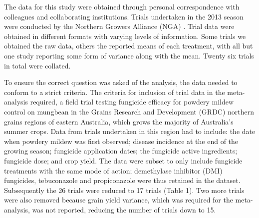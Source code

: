\documentclass[agronomy,article,submit,moreauthors,pdftex]{mdpi}
\begin{document}
The data for this study were obtained through personal correspondence
with colleagues and collaborating institutions. Trials undertaken in the
2013 season were conducted by the Northern Growers Alliance (NGA)
\citetext{\citeyear{goolhi2013}; \citeyear{premer2013}; \citeyear{Millmerran2013}; \citeyear{Marysmount2013}}.
Trial data were obtained in different formats with varying levels of
information. Some trials we obtained the raw data, others the reported
means of each treatment, with all but one study reporting some form of
variance along with the mean. Twenty six trials in total were collated.

To ensure the correct question was asked of the analysis, the data
needed to conform to a strict criteria. The criteria for inclusion of
trial data in the meta-analysis required, a field trial testing
fungicide efficacy for powdery mildew control on mungbean in the Grains
Research and Development (GRDC) northern grains regions of eastern
Australia, which grows the majority of Australia's summer crops. Data
from trials undertaken in this region had to include: the date when
powdery mildew was first observed; disease incidence at the end of the
growing season; fungicide application dates; the fungicide active
ingredients; fungicide dose; and crop yield. The data were subset to
only include fungicide treatments with the same mode of action;
demethylase inhibitor (DMI) fungicides, tebuconazole and propiconazole
were thus retained in the dataset. Subsequently the 26 trials were
reduced to 17 trials (Table 1). Two more trials were also removed
because grain yield variance, which was required for the meta-analysis,
was not reported, reducing the number of trials down to 15.
\end{document}
